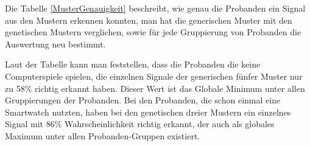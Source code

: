 Die Tabelle \autoref{MusterGenauigkeit} beschreibt, wie genau die Probanden ein Signal aus den Mustern erkennen konnten, man hat die generischen Muster mit den genetischen Mustern verglichen, sowie f{\"u}r jede Gruppierung von Probanden die Auswertung neu bestimmt. 

Laut der Tabelle kann man feststellen, dass die Probanden die keine Computerspiele spielen, die einzelnen Signale der generischen f{\"u}nfer Muster nur zu 58\% richtig erkannt haben. Dieser Wert ist das Globale Minimum unter allen Gruppierungen der Probanden.
Bei den Probanden, die schon einmal eine Smartwatch nutzten, haben bei den genetischen dreier Mustern ein einzelnes Signal mit 86\% Wahrscheinlichkeit richtig erkannt, der auch als globales Maximum unter allen Probanden-Gruppen existiert.


